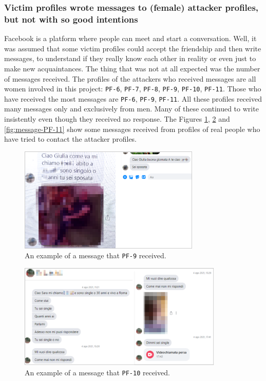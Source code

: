 \subsubsection*{Victim profiles wrote messages to (female) attacker profiles, but not with so good intentions}
Facebook is a platform where people can meet and start a conversation. Well, it was assumed that some victim profiles could accept the friendship and then write messages, to understand if they really know each other in reality or even just to make new acquaintances. The thing that was not at all expected was the number of messages received. The profiles of the attackers who received messages are all women involved in this project: \texttt{PF-6}, \texttt{PF-7}, \texttt{PF-8}, \texttt{PF-9}, \texttt{PF-10}, \texttt{PF-11}. Those who have received the most messages are \texttt{PF-6}, \texttt{PF-9}, \texttt{PF-11}. All these profiles received many messages only and exclusively from men. Many of these continued to write insistently even though they received no response. The Figures \ref{fig:message-PF-9}, \ref{fig:message-PF-10} and \ref{fig:message-PF-11} show some messages received from profiles of real people who have tried to contact the attacker profiles.
\begin{figure}[H]
	\centering
	\caption{An example of a message that \texttt{PF-9} received.}
	\label{fig:message-PF-9}
	\includegraphics[height=5cm]{immagini/pf-9.png} 
\end{figure}
\begin{figure}[H]
	\centering
	\caption{An example of a message that \texttt{PF-10} received.}
	\label{fig:message-PF-10}
	\includegraphics[height=5cm]{immagini/pf-10.png} 
\end{figure}
